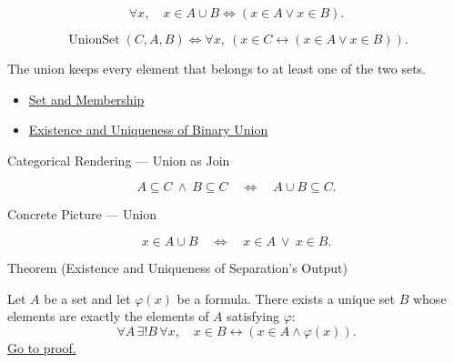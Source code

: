 \begin{remark*}
\[
  \forall x,\quad x\in A\cup B \iff (x\in A\vee x\in B).
\]
\end{remark*}

\begin{remark*}
\[
  \operatorname{UnionSet}(C,A,B)
  \iff
  \forall x,\ (x\in C \leftrightarrow (x\in A\vee x\in B)).
\]
\end{remark*}

\begin{remark*}[Interpretation]
The union keeps every element that belongs to at least one of the two sets.
\end{remark*}

\begin{dependencies}
\begin{itemize}
  \item \hyperref[def:set-membership]{Set and Membership}
  \item \hyperref[cor:binary-union-exists-unique]{Existence and Uniqueness of Binary Union}
\end{itemize}
\end{dependencies}

\begin{lracategoricalcard}{Categorical Rendering --- Union as Join}
\begin{center}

\end{center}
\[
  A\subseteq C\ \wedge\ B\subseteq C
  \quad\Longleftrightarrow\quad
  A\cup B\subseteq C.
\]
\end{lracategoricalcard}

\begin{lracategoricalcard}{Concrete Picture --- Union}
\begin{center}

\end{center}
\[
  x\in A\cup B
  \quad\Longleftrightarrow\quad
  x\in A\ \vee\ x\in B.
\]
\end{lracategoricalcard}

\begin{theorembox}{Theorem (Existence and Uniqueness of Separation's Output)}
\begin{theorem}\label{thm:separation-output-exists-unique}
Let $A$ be a set and let $\varphi(x)$ be a formula. There exists a unique set
$B$ whose elements are exactly the elements of $A$ satisfying $\varphi$:
\[
  \forall A\,\exists! B\,\forall x,\quad
  x\in B\leftrightarrow (x\in A\wedge \varphi(x)).
\]
\hyperref[prf:separation-output-exists-unique]{Go to proof.}
\end{theorem}
\end{theorembox}

